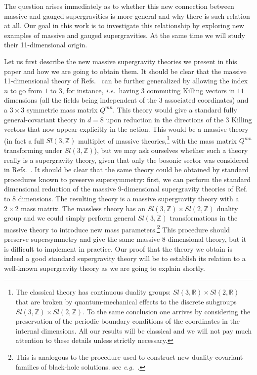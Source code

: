 \documentclass[12pt,a4paper]{article}
\begin{document}
The question arises immediately as to whether this new connection
between massive and gauged supergravities is more general and why
there is such relation at all. Our goal in this work is to investigate
this relationship by exploring new examples of massive and gauged
supergravities. At the same time we will study their 11-dimensional
origin.

Let us first describe the new massive supergravity theories we present
in this paper and how we are going to obtain them. It should be clear
that the massive 11-dimensional theory of Refs.~\cite{kn:BLO,kn:MO}
can be further generalized by allowing the index $n$ to go from $1$ to
$3$, for instance, {\em i.e.}~having $3$ commuting Killing vectors in
$11$ dimensions (all the fields being independent of the $3$
associated coordinates) and a $3\times 3$ symmetric mass matrix
$Q^{mn}$.  This theory would give a standard fully general-covariant
theory in $d=8$ upon reduction in the directions of the $3$ Killing
vectors that now appear explicitly in the action. This would be a
massive theory (in fact a full $Sl(3,\mathbb{Z})$ multiplet of massive
theories,\footnote{The classical theory has continuous duality groups:
  $Sl(3,\mathbb{R})\times Sl(2,\mathbb{R})$ that are broken by
  quantum-mechanical effects to the discrete subgroups
  $Sl(3,\mathbb{Z})\times Sl(2,\mathbb{Z})$. To the same conclusion
  one arrives by considering the preservation of the periodic boundary
  conditions of the coordinates in the internal dimensions. All our
  results will be classical and we will not pay much attention to
  these details unless strictly necessary.} with the mass matrix
$Q^{mn}$ transforming under $Sl(3,\mathbb{Z})$), but we may ask
ourselves whether such a theory really is a supergravity theory, given
that only the bosonic sector was considered in
Refs.~\cite{kn:BLO,kn:MO}. It should be clear that the same theory
could be obtained by standard procedures known to preserve
supersymmetry: first, we can perform the standard dimensional
reduction of the massive 9-dimensional supergravity theories of
Ref.~\cite{kn:MO} to 8 dimensions. The resulting theory is a massive
supergravity theory with a $2\times 2$ mass matrix. The massless
theory has an $Sl(3,\mathbb{Z})\times Sl(2,\mathbb{Z})$ duality group
and we could simply perform general $Sl(3,\mathbb{Z})$ transformations
in the massive theory to introduce new mass parameters.\footnote{This
  is analogous to the procedure used to construct new
  duality-covariant families of black-hole solutions. see {\em
    e.g.}~\cite{kn:KO}.} This procedure should preserve supersymmetry
and give the same massive 8-dimensional theory, but it is difficult to
implement in practice. Our proof that the theory we obtain is indeed a
good standard supergravity theory will be to establish its relation to
a well-known supergravity theory as we are going to explain shortly.
\end{document}
